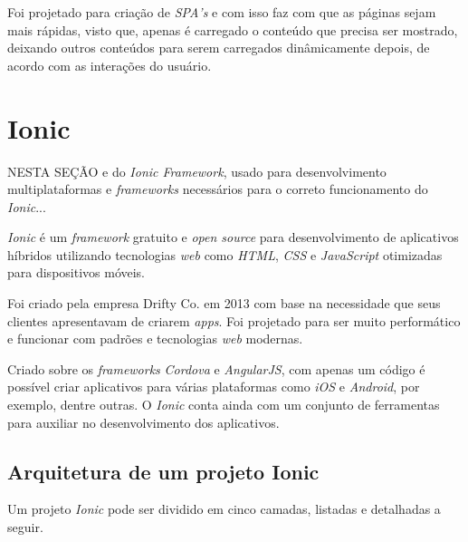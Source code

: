 Foi projetado para criação de \textit{SPA's} e com isso faz com que as páginas sejam mais rápidas, visto que, apenas é carregado o conteúdo que precisa ser mostrado, 
deixando outros conteúdos para serem carregados dinâmicamente depois, de acordo com as interações do usuário.   

\section{Ionic} \label{sec:ionic}

NESTA SEÇÃO e do \textit{Ionic Framework}, usado para desenvolvimento multiplataformas e \textit{frameworks} necessários para o correto funcionamento do \textit{Ionic}...

\textit{Ionic} é um \textit{framework} gratuito e \textit{open source} para desenvolvimento de aplicativos híbridos utilizando tecnologias 
\textit{web} como \textit{HTML}, \textit{CSS} e \textit{JavaScript} otimizadas para dispositivos móveis. 


Foi criado pela empresa Drifty Co. em 2013 com base na necessidade que seus clientes apresentavam de criarem \textit{apps}. 
Foi projetado para ser muito performático e funcionar com padrões e tecnologias \textit{web} modernas. 


Criado sobre os \textit{frameworks} \textit{Cordova} e \textit{AngularJS}, com apenas um código é possível criar aplicativos para várias 
plataformas como \textit{iOS} e \textit{Android}, por exemplo, dentre outras. O \textit{Ionic} conta ainda com um conjunto de ferramentas para auxiliar 
no desenvolvimento dos aplicativos.

\subsection{Arquitetura de um projeto Ionic} \label{subsec:arc-ionic}

Um projeto \textit{Ionic} pode ser dividido em cinco camadas, listadas e detalhadas a seguir.

